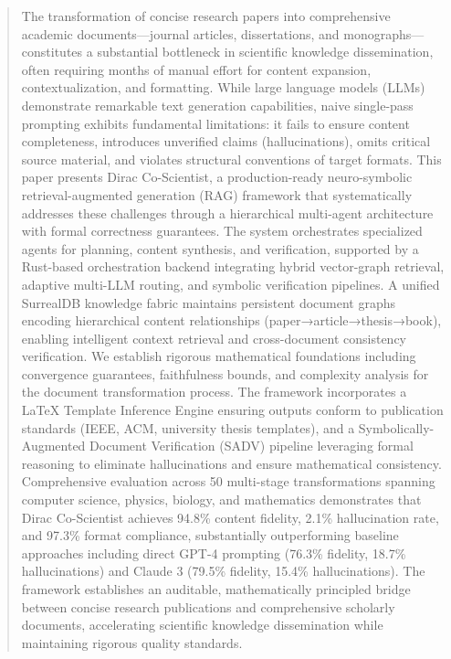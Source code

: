 \documentclass{ieeeaccess}
\begin{document}
\begin{abstract}
The transformation of concise research papers into comprehensive academic documents—journal articles, dissertations, and monographs—constitutes a substantial bottleneck in scientific knowledge dissemination, often requiring months of manual effort for content expansion, contextualization, and formatting. While large language models (LLMs) demonstrate remarkable text generation capabilities, naive single-pass prompting exhibits fundamental limitations: it fails to ensure content completeness, introduces unverified claims (hallucinations), omits critical source material, and violates structural conventions of target formats. This paper presents Dirac Co-Scientist, a production-ready neuro-symbolic retrieval-augmented generation (RAG) framework that systematically addresses these challenges through a hierarchical multi-agent architecture with formal correctness guarantees. The system orchestrates specialized agents for planning, content synthesis, and verification, supported by a Rust-based orchestration backend integrating hybrid vector-graph retrieval, adaptive multi-LLM routing, and symbolic verification pipelines. A unified SurrealDB knowledge fabric maintains persistent document graphs encoding hierarchical content relationships (paper→article→thesis→book), enabling intelligent context retrieval and cross-document consistency verification. We establish rigorous mathematical foundations including convergence guarantees, faithfulness bounds, and complexity analysis for the document transformation process. The framework incorporates a LaTeX Template Inference Engine ensuring outputs conform to publication standards (IEEE, ACM, university thesis templates), and a Symbolically-Augmented Document Verification (SADV) pipeline leveraging formal reasoning to eliminate hallucinations and ensure mathematical consistency. Comprehensive evaluation across 50 multi-stage transformations spanning computer science, physics, biology, and mathematics demonstrates that Dirac Co-Scientist achieves 94.8\% content fidelity, 2.1\% hallucination rate, and 97.3\% format compliance, substantially outperforming baseline approaches including direct GPT-4 prompting (76.3\% fidelity, 18.7\% hallucinations) and Claude 3 (79.5\% fidelity, 15.4\% hallucinations). The framework establishes an auditable, mathematically principled bridge between concise research publications and comprehensive scholarly documents, accelerating scientific knowledge dissemination while maintaining rigorous quality standards.
\end{abstract}
\end{document}

